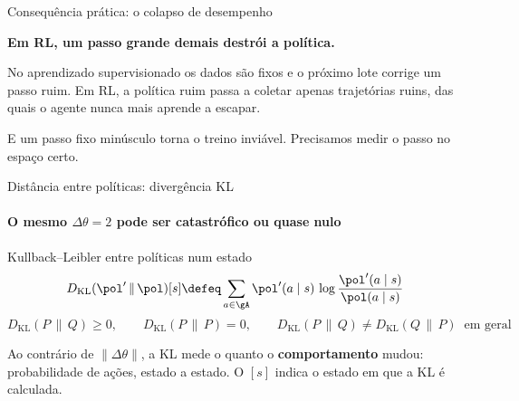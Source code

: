 \documentclass[aspectratio=169, 11pt]{beamer}
\newcommand{\KL}{D_{\mathrm{KL}}}
\begin{document}
\begin{frame}{Consequência prática: o colapso de desempenho}
  \begin{center}
    {\Large\bfseries\color{rlAzul} Em RL, um passo grande demais destrói a política.}
  \end{center}
  \vspace{0.6em}
  No aprendizado supervisionado os dados são fixos e o próximo lote corrige um passo ruim.
  Em RL, a política ruim passa a coletar \alert{apenas trajetórias ruins}, das quais o agente
  nunca mais aprende a escapar.

  \vspace{0.6em}
  E um passo fixo minúsculo torna o treino inviável. Precisamos medir o passo no espaço certo.
\end{frame}

\begin{frame}{Distância entre políticas: divergência KL}
  \framesubtitle{O mesmo $\Delta\theta = 2$ pode ser catastrófico ou quase nulo}

  \begin{defbox}{Kullback--Leibler entre políticas num estado}
    \[
      \KL(\pol'\,\|\,\pol)[s] \defeq \sum_{a\in\gA}\pol'(a\mid s)\,\log\frac{\pol'(a\mid s)}{\pol(a\mid s)}
    \]
    \[
      \KL(P\,\|\,Q)\ge 0,\qquad \KL(P\,\|\,P) = 0,\qquad \KL(P\,\|\,Q)\neq\KL(Q\,\|\,P)\ \text{ em geral}
    \]
  \end{defbox}

  \begin{ideiabox}
    Ao contrário de $\|\Delta\theta\|$, a KL mede o quanto o \textbf{comportamento} mudou:
    probabilidade de ações, estado a estado. O $[s]$ indica o estado em que a KL é calculada.
  \end{ideiabox}
\end{frame}
\end{document}
